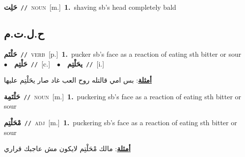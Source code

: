 \documentclass[10pt,a4paper,twoside]{article} %
\begin{document}
\begin{multicols}{2}
{\setlength\topsep{0pt}\textbf{\foreignlanguage{arabic}{حَلِت}}\ {\color{gray}\texttt{//}\color{black}}\ \textsc{noun}\ [m.]\ \textbf{1.}~shaving sb's head completely bald\ } \vspace{2mm}

\vspace{-3mm}
\subsection*{\color{blue}\foreignlanguage{arabic}{ح.ل.ت.م}\color{blue}{}} 

{\setlength\topsep{0pt}\textbf{\foreignlanguage{arabic}{حَلْتَم}}\ {\color{gray}\texttt{//}\color{black}}\ \textsc{verb}\ [p.]\ \textbf{1.}~pucker sb's face as a reaction of eating sth bitter or sour\ \ $\bullet$\ \ \setlength\topsep{0pt}\textbf{\foreignlanguage{arabic}{حَلْتِم}}\ {\color{gray}\texttt{//}\color{black}}\ [c.]\ \ $\bullet$\ \ \setlength\topsep{0pt}\textbf{\foreignlanguage{arabic}{يحَلْتِم}}\ {\color{gray}\texttt{//}\color{black}}\ [i.]\  \begin{flushright}\color{gray}\foreignlanguage{arabic}{\textbf{\underline{\foreignlanguage{arabic}{أمثلة}}}: بس امي قالتله روح العب غاد صار يحَلْتِم عليها}\end{flushright}\color{black}} \vspace{2mm}

{\setlength\topsep{0pt}\textbf{\foreignlanguage{arabic}{حَلْتَمِة}}\ {\color{gray}\texttt{//}\color{black}}\ \textsc{noun}\ [m.]\ \textbf{1.}~puckering sb's face as a reaction of eating sth bitter or sour\ } \vspace{2mm}

{\setlength\topsep{0pt}\textbf{\foreignlanguage{arabic}{مْحَلْتِم}}\ {\color{gray}\texttt{//}\color{black}}\ \textsc{adj}\ [m.]\ \textbf{1.}~puckering sb's face as a reaction of eating sth bitter or sour\  \begin{flushright}\color{gray}\foreignlanguage{arabic}{\textbf{\underline{\foreignlanguage{arabic}{أمثلة}}}: مالك مْحَلْتِم لايكون مش عاجبك قراري}\end{flushright}\color{black}} \vspace{2mm}


\end{multicols}
\end{document}

